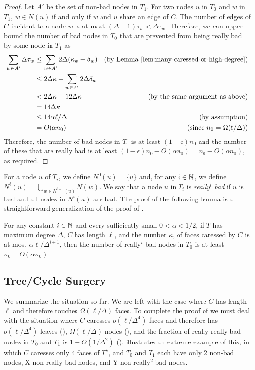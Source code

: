 \documentclass{patmorin}
\newcommand{\dual}[1]{{#1}^\star}
\begin{document}
\begin{proof}
  Let $A'$ be the set of non-bad nodes in $T_1$.  For two
  nodes $u$ in $T_0$ and $w$ in $T_1$,  $w\in N(u)$ if and only if $w$
  and $u$ share an edge of $C$.  The number of edges of $C$ incident to a node $w$ is at most $(\Delta-1)\tau_w < \Delta\tau_w$.  Therefore, we can upper bound the number of bad nodes in $T_0$ that are prevented from being really bad by some node in $T_1$ as
  \begin{align*}
   \sum_{w\in A'}\Delta \tau_w  
    & \le  \sum_{w\in A'}2\Delta(\kappa_w + \delta_w) & \text{(by \lemref{many-caressed-or-high-degree})} \\
    & \le  2\Delta\kappa + \sum_{w\in A'}2\Delta\delta_w \\
    & < 2\Delta\kappa + 12\Delta\kappa & \text{(by the same argument as above)}\\
    & = 14\Delta\kappa \\
    & \le 14\alpha\ell/\Delta & \text{(by assumption)}\\
    & = O(\alpha n_0) & \text{(since $n_0=\Omega(\ell/\Delta)$)}
  \end{align*}
  Therefore, the number of bad nodes in $T_0$ is at least
  $(1-\epsilon)n_0$ and the number of these that are really bad is
  at least $(1-\epsilon)n_0 - O(\alpha n_0) = n_0-O(\alpha n_0)$,
  as required.
\end{proof}

For a node $u$ of $T_i$, we define $N^0(u) = \{u\}$ and, for any $i\in\mathbb{N}$,
we define $N^{i}(u)=\bigcup_{w\in N^{i-1}(u)} N(w)$.   We say that a node
$u$ in $T_i$ is \emph{really$^{i}$ bad} if $u$ is bad and all nodes in
$N^i(u)$ are bad.  The proof of the following lemma is a straightforward
generalization of the proof of .

\begin{lem}
  For any constant $i\in\mathbb{N}$ and every sufficiently small $0<\alpha < 1/2$,  
  if $T$ has maximum degree $\Delta$, $C$ has length $\ell$, and the number
  $\kappa$, of faces caressed by $C$ is at most $\alpha\ell/\Delta^{i+1}$, then
  the number of really$^i$ bad nodes in $T_0$ is at least $n_0-O(\alpha n_0)$.
\end{lem}




\subsection{Tree/Cycle Surgery}

We summarize the situation so far.  We are left with the case where
$C$ has length $\ell$ and therefore touches $\Omega(\ell/\Delta)$
faces.  To complete the proof of  we must deal with
the situation where $C$ caresses $o(\ell/\Delta^4)$ faces and
therefore has $o(\ell/\Delta^4)$ leaves (),
$\Omega(\ell/\Delta)$ nodes (),
and the fraction of really really bad nodes in $T_0$ and $T_1$ is
$1-O(1/\Delta^2)$ (). 
illustrates an extreme example of this, in which $C$ caresses only 4
faces of $\dual{T}$, and $T_0$ and $T_1$ each have only 2 non-bad nodes,
X non-really bad nodes, and Y non-really$^2$ bad nodes.  
\end{document}

